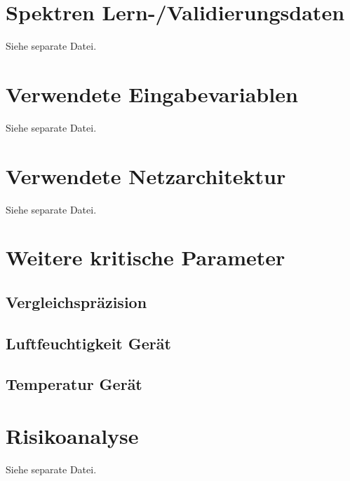 \documentclass[11pt, a4paper]{article}
\begin{document}
\section{Spektren Lern-/Validierungsdaten}
\label{append:Spektren_Lern-/Validierungsdaten}
Siehe separate Datei.

\section{Verwendete Eingabevariablen}
\label{append:Verwendete_Eingabevariablen}
Siehe separate Datei.

\section{Verwendete Netzarchitektur}
\label{append:Verwendete_Netzarchitektur}
Siehe separate Datei.

\section{Weitere kritische Parameter}
\label{append:Weitere_kritische_Parameter}

\subsection{Vergleichspräzision}



\subsection{Luftfeuchtigkeit Gerät}

\subsection{Temperatur Gerät}

\section{Risikoanalyse}
\label{append:Risikoanalyse}
Siehe separate Datei.
\end{document}
